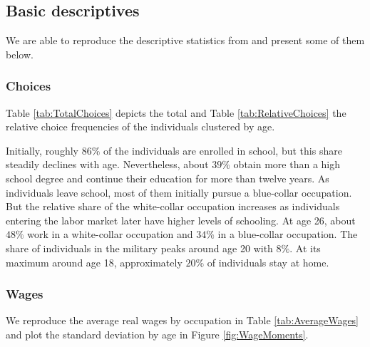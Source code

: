\subsection{Basic descriptives}
We are able to reproduce the descriptive statistics from \citet{Keane.1997} and present some of them below. 

\subsubsection*{Choices}
Table \ref{tab:TotalChoices} depicts the total and Table \ref{tab:RelativeChoices} the relative choice frequencies of the individuals clustered by age. %



Initially, roughly $86\%$ of the individuals are enrolled in school, but this share steadily declines with age. Nevertheless, about $39\%$ obtain more than a high school degree and continue their education for more than twelve years. As individuals leave school, most of them initially pursue a blue-collar occupation. But the relative share of the white-collar occupation increases as individuals entering the labor market later have higher levels of schooling. At age 26, about $48\%$ work in a white-collar occupation and $34\%$ in a blue-collar occupation. The share of individuals in the military peaks around age 20 with $8\%$. At its maximum around age 18, approximately $20\%$ of individuals stay at home.

\subsubsection*{Wages}
We reproduce the average real wages by occupation in Table \ref{tab:AverageWages} and plot the standard deviation by age in Figure \ref{fig:WageMoments}.

